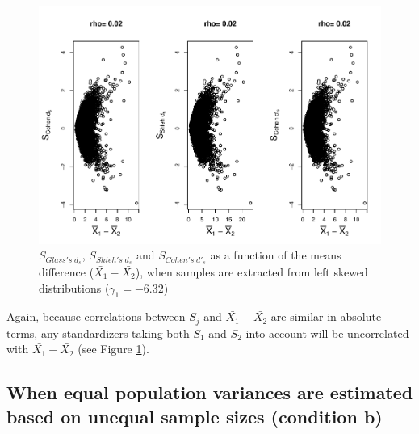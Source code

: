 \documentclass[
  man]{apa6}
\begin{document}
\begin{figure}
\centering
\includegraphics{Correlations-between-the-sample-means-difference-and-standardizers-of-all-estimators,-and-implications-on-biases-and-variances-of-all-estimators_files/figure-latex/pltStdzrHombalLskew-1.pdf}
\caption{\label{fig:pltStdzrHombalLskew}\(S_{Glass's \; d_s}\), \(S_{Shieh's \; d_s}\) and \(S_{Cohen's \; d'_s}\) as a function of the means difference (\(\bar{X_1}-\bar{X_2}\)), when samples are extracted from left skewed distributions (\(\gamma_1 = -6.32\))}
\end{figure}

Again, because correlations between \(S_j\) and \(\bar{X_1}-\bar{X_2}\) are similar in absolute terms, any standardizers taking both \(S_1\) and \(S_2\) into account will be uncorrelated with \(\bar{X_1}-\bar{X_2}\) (see Figure \ref{fig:pltStdzrHombalLskew}).

\hypertarget{when-equal-population-variances-are-estimated-based-on-unequal-sample-sizes-condition-b}{%
\subsection{When equal population variances are estimated based on unequal sample sizes (condition b)}\label{when-equal-population-variances-are-estimated-based-on-unequal-sample-sizes-condition-b}}
\end{document}
